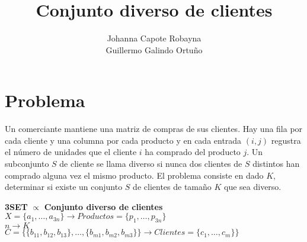 \documentclass[11pt]{article}
\title{\textbf{Conjunto diverso de clientes}}
\author{Johanna Capote Robayna\\
		Guillermo Galindo Ortuño}
\date{}
\begin{document}
\maketitle

\section*{Problema}
Un comerciante mantiene una matriz de compras de sus clientes. Hay una fila por cada cliente y una columna por cada producto y en cada entrada $(i,j)$ regustra el número de unidades que el cliente $i$ ha comprado del producto $j$. Un subconjunto $S$ de cliente se llama diverso si nunca dos clientes de $S$ distintos han comprado alguna vez el mismo producto. El problema consiste en dado $K$, determinar si existe un conjunto $S$ de clientes de tamaño $K$ que sea diverso. \\
\begin{center}
\textbf{3SET} $\propto$ \textbf{Conjunto diverso de clientes} \\
$X = \{ a_1, \dots, a_{3n} \} \rightarrow  Productos = \{p_1, \dots , p_{3n} \}  $ \\
$ n \rightarrow K$ \\
$C = \Big\{ \{ b_{11},b_{12}, b_{13}\} , \dots , \{b_{m1}, b_{m2}, b_{m3} \} \Big\} \rightarrow Clientes = \{ c_1, \dots , c_m \} \}$
\end{center}
\end{document}
